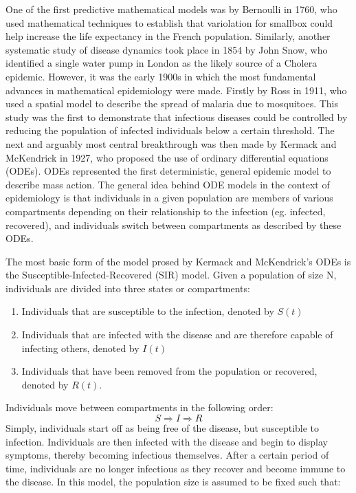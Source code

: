 One of the first predictive mathematical models was by Bernoulli in 1760, who used mathematical techniques to establish that variolation for smallbox could help increase the life expectancy in the French population.\cite{brauer} Similarly, another systematic study of disease dynamics took place in 1854 by John Snow, who identified a single water pump in London as the likely source of a Cholera epidemic.\cite{snow} However, it was the early 1900s in which the most fundamental advances in mathematical epidemiology were made. Firstly by Ross in 1911, who used a spatial model to describe the spread of malaria due to mosquitoes.\cite{snow} This study was the first to demonstrate that infectious diseases could be controlled by reducing the population of infected individuals below a certain threshold. The next and arguably most central breakthrough was then made by Kermack and McKendrick in 1927, who proposed the use of ordinary differential equations (ODEs).\cite{kermack} ODEs represented the first deterministic, general epidemic model to describe mass action. The general idea behind ODE models in the context of epidemiology is that individuals in a given population are members of various compartments depending on their relationship to the infection (eg. infected, recovered), and individuals switch between compartments as described by these ODEs.

The most basic form of the model prosed by Kermack and McKendrick's ODEs is the Susceptible-Infected-Recovered (SIR) model. Given a population of size N, individuals are divided into three states or compartments: 

\begin{enumerate}
	\item Individuals that are susceptible to the infection, denoted by $S(t)$
	\item Individuals that are infected with the disease and are therefore capable of infecting others, denoted by $I(t)$
	\item Individuals that have been removed from the population or recovered, denoted by $R(t)$. 
\end{enumerate}

Individuals move between compartments in the following order:
\begin{equation*}
S \Longrightarrow I \Longrightarrow R
\end{equation*}
Simply, individuals start off as being free of the disease, but susceptible to infection. Individuals are then infected with the disease and begin to display symptoms, thereby becoming infectious themselves. After a certain period of time, individuals are no longer infectious as they recover and become immune to the disease. In this model, the population size is assumed to be fixed such that:

